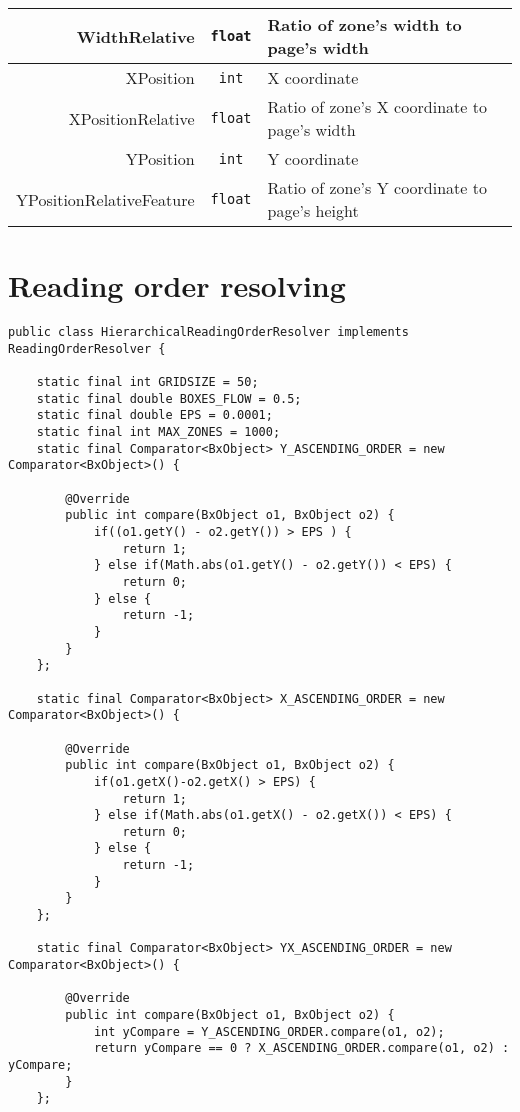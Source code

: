 \begin{appendices}
\begin{longtable}[c]{|r|c|p{8cm}|}
WidthRelative & \verb+float+ & Ratio of zone's width to page's width\\ \hline
XPosition & \verb+int+ & X coordinate\\ \hline
XPositionRelative & \verb+float+ & Ratio of zone's X coordinate to page's width \\ \hline
YPosition & \verb+int+ & Y coordinate \\ \hline
YPositionRelativeFeature & \verb+float+ & Ratio of zone's Y coordinate to page's height \\ \hline
\end{longtable}

\chapter{Reading order resolving} \label{appendix:ror}
\begin{lstlisting}
public class HierarchicalReadingOrderResolver implements ReadingOrderResolver {

    static final int GRIDSIZE = 50;
    static final double BOXES_FLOW = 0.5;
    static final double EPS = 0.0001;
    static final int MAX_ZONES = 1000;
    static final Comparator<BxObject> Y_ASCENDING_ORDER = new Comparator<BxObject>() {

        @Override
        public int compare(BxObject o1, BxObject o2) {
        	if((o1.getY() - o2.getY()) > EPS ) {
        		return 1;
        	} else if(Math.abs(o1.getY() - o2.getY()) < EPS) {
        		return 0;
        	} else {
        		return -1;
        	}
        }
    };

    static final Comparator<BxObject> X_ASCENDING_ORDER = new Comparator<BxObject>() {

        @Override
        public int compare(BxObject o1, BxObject o2) {
        	if(o1.getX()-o2.getX() > EPS) {
        		return 1;
        	} else if(Math.abs(o1.getX() - o2.getX()) < EPS) {
        		return 0;
        	} else {
        		return -1;
        	}
        }
    };
    
    static final Comparator<BxObject> YX_ASCENDING_ORDER = new Comparator<BxObject>() {

        @Override
        public int compare(BxObject o1, BxObject o2) {
            int yCompare = Y_ASCENDING_ORDER.compare(o1, o2);
            return yCompare == 0 ? X_ASCENDING_ORDER.compare(o1, o2) : yCompare;
        }
    };


\end{lstlisting}
\end{appendices}

